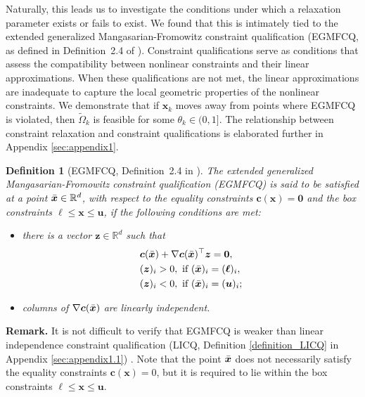 \documentclass[aos]{imsart}
\numberwithin{equation}{section}
\theoremstyle{plain}
\newtheorem{definition}{Definition}
\begin{document}
Naturally, this leads us to investigate the conditions under which a relaxation parameter exists or fails to exist. 
We found that this is intimately tied to the extended generalized Mangasarian-Fromowitz constraint qualification (EGMFCQ, as defined in Definition~2.4 of \cite{xu2015smoothing}). 
Constraint qualifications serve as conditions that assess the compatibility between nonlinear constraints and their linear approximations. 
When these qualifications are not met, the linear approximations are inadequate to capture the local geometric properties of the nonlinear constraints. 
We demonstrate that if $\bm{x}_k$ moves away from points where EGMFCQ is violated, then $\widetilde{\Omega}_k$ is feasible for some $\theta_k \in (0,1]$. 
The relationship between constraint relaxation and constraint qualifications is elaborated further in Appendix \ref{sec:appendix1}.


\begin{definition}
    [EGMFCQ, Definition~2.4 in \cite{xu2015smoothing}] 
    \label{def_MFCQ}
    The extended generalized Mangasarian-Fromowitz constraint qualification (EGMFCQ) is said to be satisfied at a point $\Bar{\bm{x}} \in \mathbb{R}^{d}$, with respect to the equality constraints $\bm{c}(\bm{x}) = \bm{0}$ and the box constraints $\bm{\ell} \leq \bm{x} \leq \bm{u}$, if the following conditions are met:
    \begin{itemize}
        \item there is a vector $\bm{z} \in \mathbb{R}^{d}$ such that
        \begin{equation}
        \label{MFCQ_z}
            \begin{split}
                & \bm{c}(\Bar{\bm{x}}) + \nabla \bm{c}(\Bar{\bm{x}})^{\top} \bm{z} = \bm{0}, \\
                & (\bm{z})_i >0,~\text{if}~(\Bar{\bm{x}})_{i} = (\bm{\ell})_i,\\
                & (\bm{z})_i < 0,~\text{if}~(\Bar{\bm{x}})_{i} = (\bm{u})_i;
            \end{split}
        \end{equation}

        \item columns of $\nabla \bm{c}(\Bar{\bm{x}})$ are linearly independent. 
    \end{itemize}
\end{definition}

\textbf{Remark.} It is not difficult to verify that EGMFCQ is weaker than linear independence constraint qualification (LICQ, Definition \ref{definition_LICQ} in Appendix \ref{sec:appendix1.1}) \cite[Definition~12.4]{jorge2006numerical}. 
Note that the point $\Bar{\bm{x}}$ does not necessarily satisfy the equality constraints $\bm{c}(\bm{x}) = 0$, but it is required to lie within the box constraints $\bm{\ell} \leq \bm{x} \leq \bm{u}$. 
\end{document}
